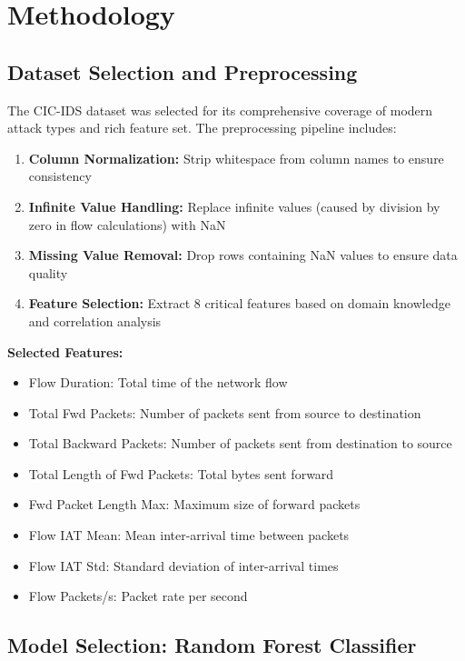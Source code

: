 \documentclass[12pt,a4paper]{article}
\begin{document}
\section{Methodology}

\subsection{Dataset Selection and Preprocessing}

The CIC-IDS dataset was selected for its comprehensive coverage of modern attack types and rich feature set. The preprocessing pipeline includes:

\begin{enumerate}
    \item \textbf{Column Normalization:} Strip whitespace from column names to ensure consistency
    \item \textbf{Infinite Value Handling:} Replace infinite values (caused by division by zero in flow calculations) with NaN
    \item \textbf{Missing Value Removal:} Drop rows containing NaN values to ensure data quality
    \item \textbf{Feature Selection:} Extract 8 critical features based on domain knowledge and correlation analysis
\end{enumerate}

\textbf{Selected Features:}
\begin{itemize}
    \item Flow Duration: Total time of the network flow
    \item Total Fwd Packets: Number of packets sent from source to destination
    \item Total Backward Packets: Number of packets sent from destination to source
    \item Total Length of Fwd Packets: Total bytes sent forward
    \item Fwd Packet Length Max: Maximum size of forward packets
    \item Flow IAT Mean: Mean inter-arrival time between packets
    \item Flow IAT Std: Standard deviation of inter-arrival times
    \item Flow Packets/s: Packet rate per second
\end{itemize}

\subsection{Model Selection: Random Forest Classifier}
\end{document}
